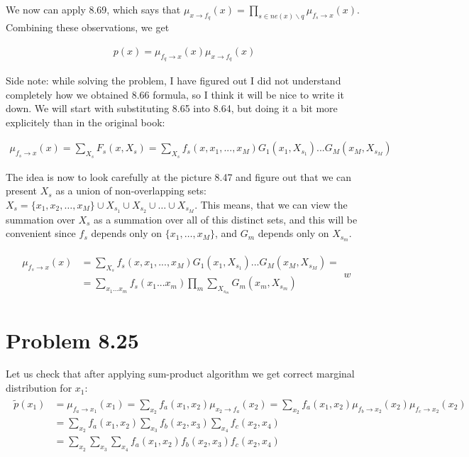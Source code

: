 \documentclass[fleqn]{article}
\begin{document}
We now can apply 8.69, which says that $\mu_{x \to f_q} (x) = \prod\limits_{s \in ne(x) \backslash q} \mu_{f_s\to x} (x)$. Combining these observations, we get

\begin{align}
	p(x) =  \mu_{f_q\to x} (x) \mu_{x \to f_q} (x)
\end{align}

Side note: while solving the problem, I have figured out I did not understand completely how we obtained 8.66 formula, so I think it will be nice to write it down. We will start with substituting 8.65 into 8.64, but doing it a bit more explicitely than in the original book:

\begin{align}
	\mu_{f_s \to x}(x) = \sum\limits_{X_s}F_s(x,X_s) =\sum\limits_{X_s} f_s(x,x_1,...,x_M)G_1 (x_1,X_{s_1})...G_M (x_M,X_{s_M})
\end{align}

The idea is now to look carefully at the picture 8.47 and figure out that we can present $X_s$ as a union of non-overlapping sets: $X_s = \{x_1, x_2, \ldots, x_M\} \cup X_{s_1} \cup X_{s_2} \cup \ldots  \cup X_{s_M}$. This means, that we can view the summation over $X_s$ as a summation over all of this distinct sets, and this will be convenient since $f_s$ depends only on $\{x_1,\ldots,x_M\}$, and $G_m$ depends only on $X_{s_m}$. 

\begin{align}
	\begin{split}
	\mu_{f_s \to x}(x) &= \sum\limits_{X_s} f_s(x,x_1,...,x_M)G_1 (x_1,X_{s_1})...G_M (x_M,X_{s_M}) = \\
	&= \sum\limits_{x_1...x_m}f_s(x_1...x_m)\prod\limits_{m}\sum\limits_{X_{s_m}}G_m(x_m, X_{s_m})
	\end{split}w
\end{align}

\section*{Problem 8.25}

Let us check that after applying sum-product algorithm we get correct marginal distribution for $x_1$:
\begin{align}
	\begin{split}
	\tilde p(x_1) &= \mu_{f_a\to x_1}(x_1) = \sum\limits_{x_2}f_a(x_1, x_2)\mu_{x_2\to f_a}(x_2) =  \sum\limits_{x_2}f_a(x_1, x_2)\mu_{f_b\to x_2}(x_2) \mu_{f_c\to x_2}(x_2) \\
	&= \sum\limits_{x_2}f_a(x_1, x_2)\sum\limits_{x_3}f_b(x_2, x_3)\sum\limits_{x_4}f_c(x_2, x_4) \\
	&= \sum\limits_{x_2}\sum\limits_{x_3}\sum\limits_{x_4}f_a(x_1, x_2)f_b(x_2, x_3)f_c(x_2, x_4)
		\end{split}
\end{align}
\end{document}
